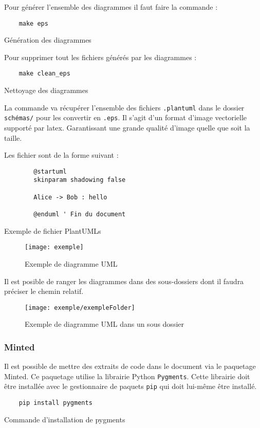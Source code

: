 Pour générer l'ensemble des diagrammes il faut faire la commande :
\begin{code}
    \begin{verbatim}
    make eps
\end{verbatim}
    \caption{Génération des diagrammes}
\end{code}

Pour supprimer tout les fichiers générés par les diagrammes :
\begin{code}
    \begin{verbatim}
    make clean_eps
\end{verbatim}
    \caption{Nettoyage des diagrammes}
\end{code}

La commande va récupérer l'ensemble des fichiers \verb=.plantuml=
dans le dossier \verb=schémas/= pour les convertir en \verb=.eps=.
Il s'agit d'un format d'image vectorielle supporté par \gls{latex}.
Garantissant une grande qualité d'image quelle que soit la taille.

Les fichier sont de la forme suivant :
\begin{code}
    \begin{verbatim}
        @startuml
        skinparam shadowing false

        Alice -> Bob : hello

        @enduml ' Fin du document
    \end{verbatim}
    \caption{Exemple de fichier PlantUMLs}
\end{code}

\begin{figure}[H]
    \centering
    \texttt{[image: exemple]}
    \caption{Exemple de diagramme UML}
\end{figure}

Il est posible de ranger les diagrammes dans des sous-dossiers dont il faudra préciser le chemin relatif.
\begin{figure}[H]
    \centering
    \texttt{[image: exemple/exempleFolder]}
    \caption{Exemple de diagramme UML dans un sous dossier }
\end{figure}

\subsubsection{Minted}
Il est possible de mettre des extraits de code dans le document via le paquetage Minted.
Ce paquetage utilise la librairie Python \verb=Pygments=.
Cette librairie doit être installée avec le gestionnaire de paquets \verb=pip= qui doit lui-même être installé.
\begin{code}
    \begin{verbatim}
    pip install pygments
\end{verbatim}
    \caption{Commande d'installation de pygments}
\end{code}

